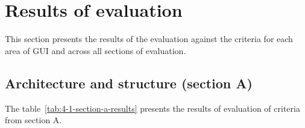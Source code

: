 \section{Results of evaluation}\label{sec:results-of-evaluation}

This section presents the results of the evaluation against the criteria for each area of GUI and across all sections of evaluation.

\subsection{Architecture and structure (section A)}\label{subsec:architecture-and-structure2}

The table~\ref{tab:4-1-section-a-results} presents the results of evaluation of criteria from section A\@.

